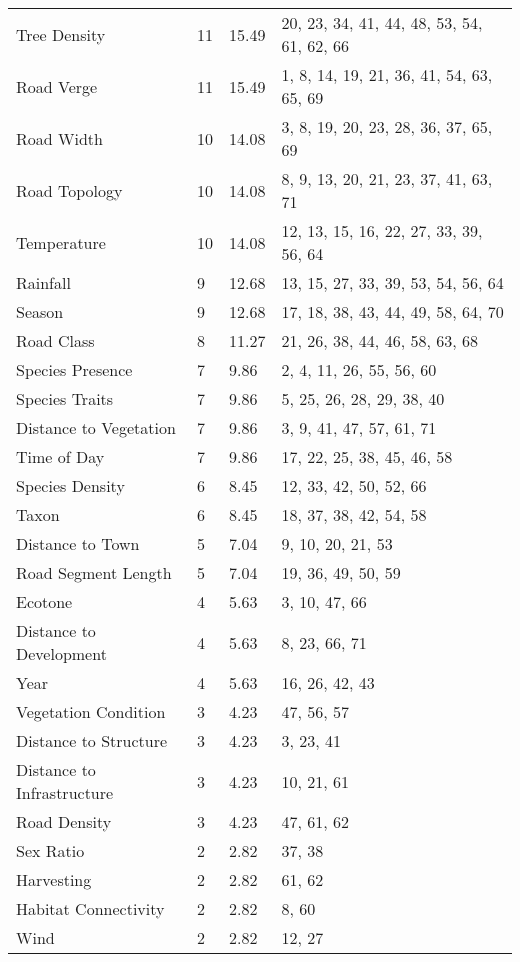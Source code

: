 \begin{longtable}[c]{p{3.5cm}p{2.0cm}p{2.5cm}p{5.5cm}}
  Tree Density &  11 & 15.49 & 20, 23, 34, 41, 44, 48, 53, 54, 61, 62, 66 \\ 
  Road Verge &  11 & 15.49 & 1, 8, 14, 19, 21, 36, 41, 54, 63, 65, 69 \\ 
  Road Width &  10 & 14.08 & 3, 8, 19, 20, 23, 28, 36, 37, 65, 69 \\ 
  Road Topology &  10 & 14.08 & 8, 9, 13, 20, 21, 23, 37, 41, 63, 71 \\ 
  Temperature &  10 & 14.08 & 12, 13, 15, 16, 22, 27, 33, 39, 56, 64 \\ 
  Rainfall &   9 & 12.68 & 13, 15, 27, 33, 39, 53, 54, 56, 64 \\ 
  Season &   9 & 12.68 & 17, 18, 38, 43, 44, 49, 58, 64, 70 \\ 
  Road Class &   8 & 11.27 & 21, 26, 38, 44, 46, 58, 63, 68 \\ 
  Species Presence &   7 & 9.86 & 2, 4, 11, 26, 55, 56, 60 \\ 
  Species Traits &   7 & 9.86 & 5, 25, 26, 28, 29, 38, 40 \\ 
  Distance to Vegetation &   7 & 9.86 & 3, 9, 41, 47, 57, 61, 71 \\ 
  Time of Day &   7 & 9.86 & 17, 22, 25, 38, 45, 46, 58 \\ 
  Species Density &   6 & 8.45 & 12, 33, 42, 50, 52, 66 \\ 
  Taxon &   6 & 8.45 & 18, 37, 38, 42, 54, 58 \\ 
  Distance to Town &   5 & 7.04 & 9, 10, 20, 21, 53 \\ 
  Road Segment Length &   5 & 7.04 & 19, 36, 49, 50, 59 \\ 
  Ecotone &   4 & 5.63 & 3, 10, 47, 66 \\ 
  Distance to Development &   4 & 5.63 & 8, 23, 66, 71 \\ 
  Year &   4 & 5.63 & 16, 26, 42, 43 \\ 
  Vegetation Condition &   3 & 4.23 & 47, 56, 57 \\ 
  Distance to Structure &   3 & 4.23 & 3, 23, 41 \\ 
  Distance to Infrastructure &   3 & 4.23 & 10, 21, 61 \\ 
  Road Density &   3 & 4.23 & 47, 61, 62 \\ 
  Sex Ratio &   2 & 2.82 & 37, 38 \\ 
  Harvesting &   2 & 2.82 & 61, 62 \\ 
  Habitat Connectivity &   2 & 2.82 & 8, 60 \\ 
  Wind &   2 & 2.82 & 12, 27 \\ 

\end{longtable}
